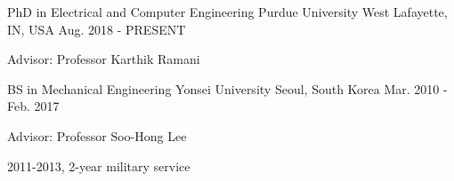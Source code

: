 


\begin{cventries}


    \cventry
    {PhD in Electrical and Computer Engineering} %
    {Purdue University} %
    {West Lafayette, IN, USA} %
    {Aug. 2018 - PRESENT} %
    { %
    \begin{cvitems}
        \item {Advisor: Professor Karthik Ramani}
    \end{cvitems}
    }

    \cventry
    {BS in Mechanical Engineering} %
    {Yonsei University} %
    {Seoul, South Korea} %
    {Mar. 2010 - Feb. 2017} %
    { %
    \begin{cvitems}
        \item {Advisor: Professor Soo-Hong Lee}
        \item {2011-2013, 2-year military service}
    \end{cvitems}
    }

\end{cventries}
